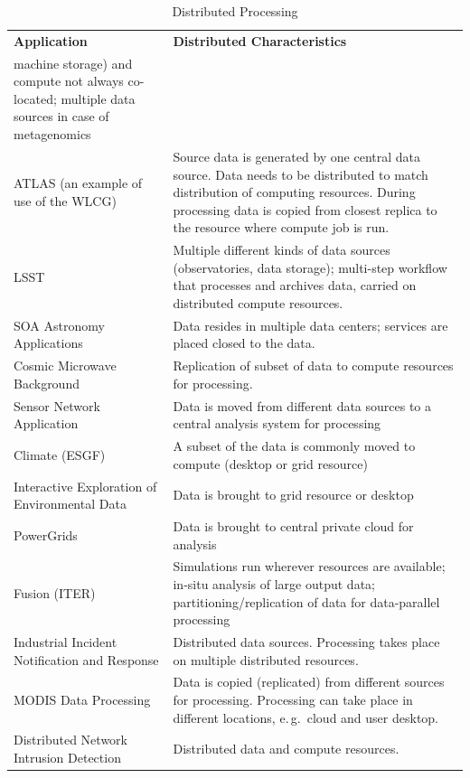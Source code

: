 \documentclass[times]{cpeauth}
\begin{document}
\begin{table}[h]
  \begin{scriptsize}
    \begin{center}
      \caption{Distributed Processing}\label{tab:app_distributed_processing}
      \begin{tabular}{|p{3.5cm}|p{10.2cm}|} \hline \textbf{Application}
&\textbf{Distributed Characteristics} \\
machine storage) and compute not always co-located; multiple data sources in
case of metagenomics \\ \hline ATLAS (an example of use of the WLCG) &Source
data is generated by one central data source. Data needs to be distributed to
match distribution of computing resources. During processing data is copied from
closest replica to the resource where compute job is run. \\ \hline LSST
&Multiple different kinds of data sources (observatories, data storage);
multi-step workflow that processes and archives data, carried on distributed
compute resources.\\ \hline SOA Astronomy Applications &Data resides in multiple
data centers; services are placed closed to the data.\\ \hline Cosmic Microwave
Background &Replication of subset of data to compute resources for processing.\\
\hline Sensor Network Application & Data is moved from different data sources to
a central analysis system for processing\\ \hline Climate (ESGF) &A subset of
the data is commonly moved to compute (desktop or grid resource)\\ \hline
Interactive Exploration of Environmental Data &Data is brought to grid resource
or desktop \\ \hline PowerGrids &Data is brought to central private cloud for
analysis\\ \hline Fusion (ITER) &Simulations run wherever resources are
available; in-situ analysis of large output data; partitioning/replication of
data for data-parallel processing\\ \hline Industrial Incident Notification and
Response &Distributed data sources. Processing takes place on multiple
distributed resources. \\ \hline MODIS Data Processing & Data is copied
(replicated) from different sources for processing.  Processing can take place
in different locations, e.\,g.\ cloud and user desktop. \\ \hline Distributed
Network Intrusion Detection &Distributed data and compute resources.\\ \hline
     \end{tabular}
    \end{center}
  \end{scriptsize}
\end{table}
\end{document}
